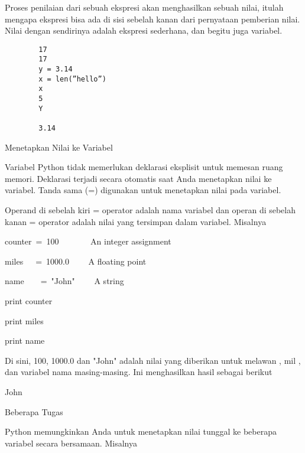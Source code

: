 Proses penilaian dari sebuah ekspresi akan menghasilkan sebuah nilai, itulah mengapa ekspresi bisa ada di sisi sebelah kanan dari pernyataan pemberian nilai. Nilai dengan sendirinya adalah ekspresi sederhana, dan begitu juga variabel.
	\begin{verbatim}
		17
		17 
		y = 3.14 
		x = len(”hello”) 
		x 
		5 
		Y

		3.14
	\end{verbatim}
Menetapkan Nilai ke Variabel \par
\vspace{12pt}
\noindent 
Variabel Python tidak memerlukan deklarasi eksplisit untuk memesan ruang memori. $  $Deklarasi terjadi secara otomatis saat Anda menetapkan nilai ke variabel. $  $Tanda sama (=) digunakan untuk menetapkan nilai pada variabel. \par
\vspace{12pt}
\noindent 
Operand di sebelah kiri = operator adalah nama variabel dan operan di sebelah kanan = operator adalah nilai yang tersimpan dalam variabel. $  $Misalnya  \par
\vspace{12pt}
\noindent 
counter~=~100~~~~~~~    An integer assignment \par
\noindent 
miles~~~=~1000.0~~~~    A floating point \par
\noindent 
name~~~~=~"John"~~~~    A string \par
\vspace{12pt}
\noindent 
print counter \par
\noindent 
print miles \par
\noindent 
print name \par
\vspace{12pt}
\noindent 
Di sini, 100, 1000.0 dan "John" adalah nilai yang diberikan untuk $  $melawan $  $, $  $mil $  $, dan $  $variabel $  $nama $  $masing-masing. $  $Ini menghasilkan hasil sebagai berikut  \par
\vspace{12pt}
 \par
{} \par
\noindent 
John \par
\vspace{12pt}
\noindent 
Beberapa Tugas \par
\noindent 
Python memungkinkan Anda untuk menetapkan nilai tunggal ke beberapa variabel secara bersamaan. $  $Misalnya  \par
\vspace{12pt}
